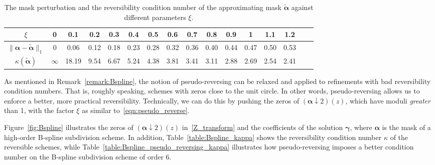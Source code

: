 \documentclass[12pt]{article}
\begin{document}
\begin{table}[H]
\begin{center}
    \begin{tabular}{| c || c | c | c | c | c | c | c | c | c | c | c | c | c | c | c |} 
     \hline
     $\xi$ & 0 & 0.1 & 0.2 & 0.3 & 0.4 & 0.5 & 0.6 & 0.7 & 0.8 & 0.9 & 1 & 1.1 & 1.2 \\
     \hline
     $\|\boldsymbol{\alpha}-\widetilde{\boldsymbol{\alpha}}\|_1$ & 0 & 0.06 & 0.12 & 0.18 & 0.23 &  0.28 & 0.32 & 0.36 &  0.40 & 0.44 & 0.47 & 0.50 & 0.53 \\
     \hline
     $\kappa(\widetilde{\boldsymbol{\alpha}})$ & $\infty$ & 18.19 & 9.54 & 6.67 & 5.24 & 4.38 & 3.81 & 3.41 & 3.11 & 2.88 & 2.69 & 2.54 & 2.41 \\
     \hline
    \end{tabular}
\end{center}
    \caption{The mask perturbation and the reversibility condition number of the approximating mask $\widetilde{\boldsymbol{\alpha}}$ against different parameters $\xi$.}
    \label{table:LS_kappa}
\end{table}

As mentioned in Remark~\ref{remark:Bspline}, the notion of pseudo-reversing can be relaxed and applied to refinements with bad reversibility condition numbers. That is, roughly speaking, schemes with zeros close to the unit circle. In other words, pseudo-reversing allows us to enforce a better, more practical reversibility. Technically, we can do this by pushing the zeros of $(\boldsymbol{\alpha}\downarrow 2)(z)$, which have moduli \emph{greater} than 1, with the factor $\xi$ as similar to~\eqref{eqn:pseudo_reverse}.

Figure~\ref{fig:Bspline} illustrates the zeros of $(\boldsymbol{\alpha}\downarrow 2)(z)$ in~\eqref{Z_transform} and the coefficients of the solution $\boldsymbol{\gamma}$, where $\boldsymbol{\alpha}$ is the mask of a high-order B-spline subdivision scheme. In addition, Table~\ref{table:Bspline_kappa} shows the reversibility condition number $\kappa$ of the reversible schemes, while Table~\ref{table:Bspline_pseudo_reversing_kappa} illustrates how pseudo-reversing imposes a better condition number on the B-spline subdivision scheme of order 6.
\end{document}
